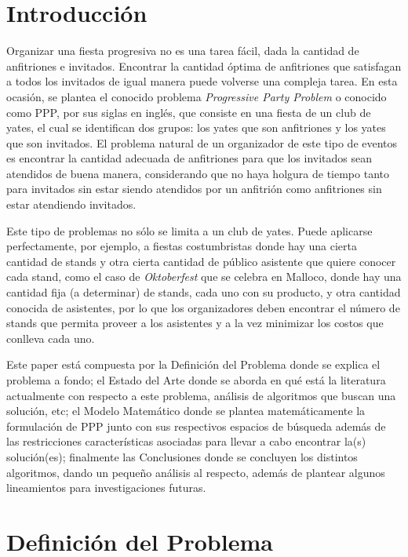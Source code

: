 \documentclass[letter, 10pt]{article}
\begin{document}
\section{Introducción}

Organizar una fiesta progresiva no es una tarea fácil, dada la cantidad de anfitriones e invitados. Encontrar la cantidad óptima de anfitriones que satisfagan a todos los invitados de igual manera puede volverse una compleja tarea. En esta ocasión, se plantea el conocido problema \textit{Progressive Party Problem} o conocido como PPP, por sus siglas en inglés, que consiste en una fiesta de un club de yates, el cual se identifican dos grupos: los yates que son anfitriones y los yates que son invitados. El problema natural de un organizador de este tipo de eventos es encontrar la cantidad adecuada de anfitriones para que los invitados sean atendidos de buena manera, considerando que no haya holgura de tiempo tanto para invitados sin estar siendo atendidos por un anfitrión como anfitriones sin estar atendiendo invitados.

Este tipo de problemas no sólo se limita a un club de yates. Puede aplicarse perfectamente, por ejemplo, a fiestas costumbristas donde hay una cierta cantidad de stands y otra cierta cantidad de público asistente que quiere conocer cada stand, como el caso de \textit{Oktoberfest} que se celebra en Malloco, donde hay una cantidad fija (a determinar) de stands, cada uno con su producto, y otra cantidad conocida de asistentes, por lo que los organizadores deben encontrar el número de stands que permita proveer a los asistentes y a la vez minimizar los costos que conlleva cada uno.

Este paper está compuesta por la Definición del Problema donde se explica el problema a fondo; el Estado del Arte donde se aborda en qué está la literatura actualmente con respecto a este problema, análisis de algoritmos que buscan una solución, etc; el Modelo Matemático donde se plantea matemáticamente la formulación de PPP junto con sus respectivos espacios de búsqueda además de las restricciones características asociadas para llevar a cabo encontrar la(s) solución(es); finalmente las Conclusiones donde se concluyen los distintos algoritmos, dando un pequeño análisis al respecto, además de plantear algunos lineamientos para investigaciones futuras.


\section{Definición del Problema}
\end{document}
